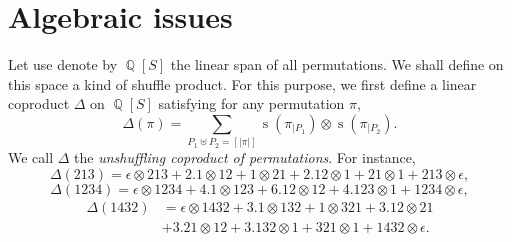 \documentclass[a4paper,10pt]{llncs}
\DeclareMathOperator{\QQ}{\mathbb{Q}}
\DeclareMathOperator{\STD}{\mathrm{s}}
\begin{document}
\section{Algebraic issues}
\label{section:Algebraic issues}
Let use denote by $\QQ[S]$ the linear span of all permutations. We shall
define on this space a kind of shuffle product. For this purpose, we
first define a linear coproduct $\Delta$ on $\QQ[S]$ satisfying for
any permutation $\pi$,
\begin{equation} \label{equ:unshuffling_coproduct}
    \Delta(\pi) =
    \sum_{P_1 \uplus P_2 = [|\pi|]}
    \STD\left(\pi_{|P_1}\right) \otimes \STD\left(\pi_{|P_2}\right).
\end{equation}
We call $\Delta$ the {\em unshuffling coproduct of permutations}. For
instance,
\begin{equation}
    \Delta(213) =
    \epsilon \otimes 213 + 2. 1 \otimes 12 +
    1 \otimes 21 + 2. 12 \otimes 1 + 21 \otimes 1 + 213 \otimes \epsilon,
\end{equation}
\begin{equation}
    \Delta(1234) =
    \epsilon \otimes 1234 + 4. 1 \otimes 123 + 6. 12 \otimes 12 +
    4. 123 \otimes 1 + 1234 \otimes \epsilon,
\end{equation}
\begin{equation}\begin{split} \label{equ:example_unshuffling_coproduct}
    \Delta(1432) & =
    \epsilon \otimes 1432 + 3. 1 \otimes 132 + 1 \otimes 321 +
    3. 12 \otimes 21 \\ & + 3. 21 \otimes 12 + 3. 132 \otimes 1 +
    321 \otimes 1 + 1432 \otimes \epsilon.
\end{split}\end{equation}
\medskip
\end{document}
